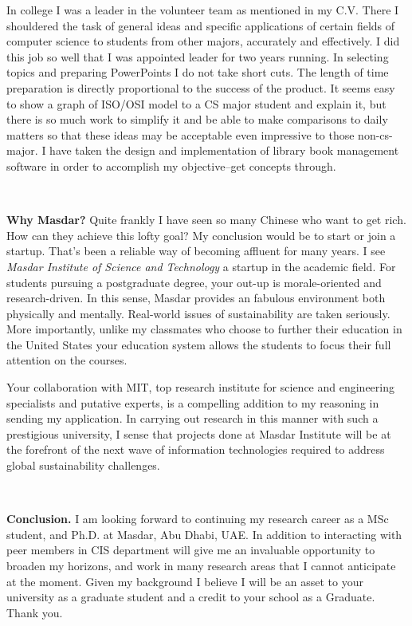 \documentclass[a4paper]{article}
\begin{document}
In college I was a leader in the volunteer team as mentioned in my C.V. There I shouldered the task of general ideas and specific applications of certain fields of computer science to students from other majors, accurately and effectively. I did this job so well that I was appointed leader for two years running. In selecting topics and preparing PowerPoints I do not take short cuts. The length of time preparation is directly proportional to the success of the product. It seems easy to show a graph of ISO/OSI model to a CS major student and explain it, but there is so much work to simplify it and be able to make comparisons to daily matters so that these ideas may be acceptable even impressive to those non-cs-major. I have taken the design and implementation of library book management software in order to accomplish my objective--get concepts through.
\par
~
\par
\noindent \textbf{Why Masdar?} Quite frankly I have seen so many Chinese who want to get rich. How can they achieve this lofty goal? My conclusion would be to start or join a startup. That's been a reliable way of becoming affluent for many years. I see \emph{Masdar Institute of Science and Technology} a startup in the academic field. For students pursuing a postgraduate degree, your out-up is morale-oriented and research-driven. In this sense, Masdar provides an fabulous environment both physically and mentally. Real-world issues of sustainability are taken seriously. More importantly, unlike my classmates who choose to further their education in the United States your education system allows the students to focus their full attention on the courses.
\par
Your collaboration with MIT, top research institute for science and engineering specialists and putative experts, is a compelling addition to my reasoning in sending my application. In carrying out research in this manner with such a prestigious university, I sense that projects done at Masdar Institute will be at the forefront of the next wave of information technologies required to address global sustainability challenges.
\par
~
\par
\noindent \textbf{Conclusion.} I am looking forward to continuing my research career as a MSc student, and Ph.D. at Masdar, Abu Dhabi, UAE. In addition to interacting with peer members in CIS department will give me an invaluable opportunity to broaden my horizons, and work in many research areas that I cannot anticipate at the moment. Given my background I believe I will be an asset to your university as a graduate student and a credit to your school as a Graduate. Thank you.
\end{document}

